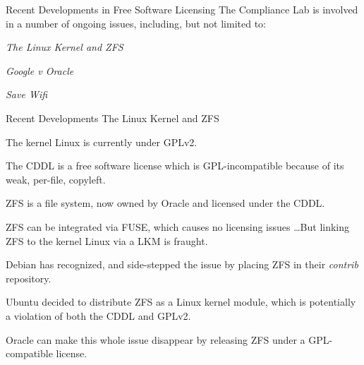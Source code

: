 \documentclass[
  size=12pt,
  style=simple,
  paper=screen
]{powerdot}
\begin{document}
\begin{wideslide}{Recent Developments in Free Software Licensing}
  The Compliance Lab is involved in a number of ongoing issues,
  including, but not limited to:
  \begin{itemize}
    \setlength{\itemsep}{1em}

    \nitem \emph{The Linux Kernel and ZFS}

    \nitem \emph{Google v Oracle}

    \nitem \emph{Save Wifi}
  \end{itemize}
\end{wideslide}


\begin{wideslide}{Recent Developments}
  The Linux Kernel and ZFS

  \pp

  \begin{itemize}

    \nitem The kernel Linux is currently under GPLv2.

    \pp

    \nitem The CDDL is a free software license which is
    GPL-incompatible because of its weak, per-file, copyleft.

    \pp

    \nitem ZFS is a file system, now owned by Oracle and licensed
    under the CDDL.

    \pp

  \end{itemize}
  \begin{itemize}

    \nitem ZFS can be integrated via FUSE, which causes no licensing
    issues \ldots \pp But linking ZFS to the kernel Linux via a LKM is
    fraught.

    \pp

    \nitem Debian has recognized, and side-stepped the issue by
    placing ZFS in their \emph{contrib} repository.

    \pp

    \nitem Ubuntu decided to distribute ZFS as a Linux kernel module,
    which is potentially a violation of both the CDDL and GPLv2.

    \pp

    \nitem Oracle can make this whole issue disappear by releasing ZFS
    under a GPL-compatible license.

  \end{itemize}
\end{wideslide}
\end{document}
